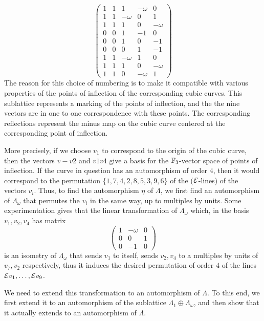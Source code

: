 \begin{equation} \label{eq-roots} \left(\begin{array}{ccccc}1 & 1 & 1 & -\omega & 0 \\1
& 1 & -\omega & 0 & 1 \\1 & 1 & 1 & 0 & -\omega \\0 & 0 & 1 & -1 & 0 \\0 & 0 & 1 & 0 &
-1 \\0 & 0 & 0 & 1 & -1 \\1 & 1 & -\omega & 1 & 0 \\1 & 1 & 1 & 0 & -\omega \\1 & 1 & 0
& -\omega & 1\end{array}\right) \end{equation} The reason for this choice of numbering
is to make it compatible with various properties of the points of inflection of the
corresponding cubic curves. This sublattice represents a marking of the points of
inflection, and the the nine vectors are in one to one correspondence with these
points. The corresponding reflections represent the minus map on the cubic curve
centered at the corresponding point of inflection.



More precisely, if we choose $v_1$ to correspond to the origin of the cubic curve, then
the vectors $v-v2$ and $v1v4$ give a basis for the ${ \mathbb F }_3$-vector space of points of
inflection. If the curve in question has an automorphism of order $4$, then it would
correspond to the permutation $\{1,7,4,2,8,5,3,9,6\}$ of the (${ \mathcal E }$-lines) of the
vectors $v_i$. Thus, to find the automorphism $\eta$ of $\Lambda$, we first find an
automorphism of $\Lambda_\omega$ that permutes the $v_i$ in the same way, up to
multiples by units. Some experimentation gives that the linear transformation of
$\Lambda_\omega$ which, in the basis $v_1,v_2,v_4$ has matrix \begin{equation}
\label{eq-orderfour} \left(\begin{array}{ccc}1 & -\omega & 0 \\0 & 0 & 1 \\0 & -1 &
0\end{array}\right) \end{equation} is an isometry of $\Lambda_\omega$ that sends $v_1$
to itself, sends $v_2, v_4$ to a multiples by units of $v_7, v_2$ respectively, thus it
induces the desired permutation of order $4$ of the lines ${ \mathcal E } v_1,\dots,{ \mathcal E } v_9$.

We need to extend this transformation to an automorphism of $\Lambda$. To this end, we
first extend it to an automorphism of the sublattice $\Lambda_1\oplus\Lambda_\omega$,
and then show that it actually extends to an automorphism of $\Lambda$.

